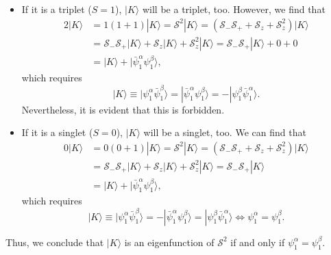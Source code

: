 \documentclass[a4paper]{book}
\newcounter{solution}[chapter]
\begin{document}
\begin{solution}
\begin{itemize}
\begin{itemize}
	\item If it is a triplet ($S=1$), $|K \rangle$ will be a triplet, too. 
	However, we find that
	\begin{align*}
		2 | K \rangle &= 1(1+1) | K \rangle = \mathscr{S}^2 | K \rangle = ( \mathscr{S}_- \mathscr{S}_+ + \mathscr{S}_z + \mathscr{S}_z^2 ) | K \rangle \\
		&= \mathscr{S}_- \mathscr{S}_+ | K \rangle + \mathscr{S}_z | K \rangle + \mathscr{S}_z^2 | K \rangle = \mathscr{S}_- \mathscr{S}_+ | K \rangle + 0 + 0 \\
		&= | K \rangle + |\bar{\psi}_1^\alpha \psi^\beta_1 \rangle,
	\end{align*}
	which requires
	\[
		| K \rangle \equiv |\psi_1^\alpha \bar{\psi}^\beta_1 \rangle = | \bar{\psi}_1^\alpha \psi^\beta_1 \rangle = - | \psi^\beta_1 \bar{\psi}_1^\alpha \rangle.
	\]
	Nevertheless, it is evident that this is forbidden.
	
	\item If it is a singlet ($S=0$), $|K \rangle$ will be a singlet, too. We can find that
	\begin{align*}
		0 | K \rangle &= 0(0+1) | K \rangle = \mathscr{S}^2 | K \rangle = ( \mathscr{S}_- \mathscr{S}_+ + \mathscr{S}_z + \mathscr{S}_z^2 ) | K \rangle \\
		&= \mathscr{S}_- \mathscr{S}_+ | K \rangle + \mathscr{S}_z | K \rangle + \mathscr{S}_z^2 | K \rangle = \mathscr{S}_- \mathscr{S}_+ | K \rangle \\
		&= | K \rangle + |\bar{\psi}_1^\alpha \psi^\beta_1 \rangle,
	\end{align*}
	which requires
	\[
		| K \rangle \equiv |\psi_1^\alpha \bar{\psi}^\beta_1 \rangle = - |\bar{\psi}_1^\alpha \psi^\beta_1 \rangle = |\psi^\beta_1 \bar{\psi}_1^\alpha \rangle \Leftrightarrow \psi^\alpha_1 = \psi^\beta_1 .
	\]
	
	\end{itemize}		
	
	Thus, we conclude that $| K \rangle$ is an eigenfunction of $\mathscr{S}^2$ if and only if $\psi^\alpha_1 = \psi^\beta_1$.
	

\end{itemize}
\end{solution}
\end{document}
